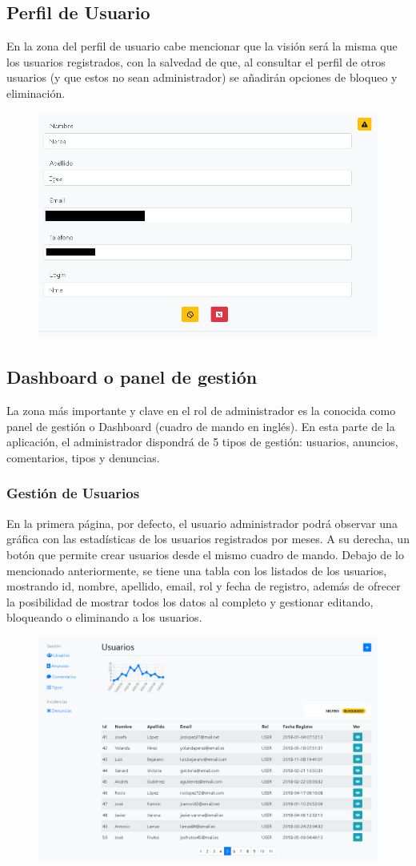 \subsection{Perfil de Usuario}
En la zona del perfil de usuario cabe mencionar que la visi\'{o}n ser\'{a} la misma que los usuarios registrados, con la salvedad de que, al consultar el perfil de otros usuarios (y que estos no sean administrador) se a\~{n}adir\'{a}n opciones de bloqueo y eliminaci\'{o}n.
\begin{figure}[h!]
\centering
\includegraphics[width=.4\textwidth]{Img/ManualUsuario/ADMIN_SEARCH_USER.png}
\end{figure}


\subsection{Dashboard o panel de gesti\'{o}n}
La zona m\'{a}s importante y clave en el rol de administrador es la conocida como panel de gesti\'{o}n o Dashboard (cuadro de mando en ingl\'{e}s).  En esta parte de la aplicaci\'{o}n, el administrador dispondr\'{a} de 5 tipos de gesti\'{o}n: usuarios, anuncios, comentarios, tipos y denuncias.

\subsubsection{Gesti\'{o}n de Usuarios}
En la primera p\'{a}gina, por defecto, el usuario administrador podr\'{a} observar una gr\'{a}fica con las estad\'{i}sticas de los usuarios registrados por meses. A su derecha, un bot\'{o}n que permite crear usuarios desde el mismo cuadro de mando. Debajo de lo mencionado anteriormente, se tiene una tabla con los listados de los usuarios, mostrando id, nombre, apellido, email, rol y fecha de registro, adem\'{a}s de ofrecer la posibilidad de mostrar todos los datos al completo y gestionar editando, bloqueando o eliminando a los usuarios.

\begin{figure}[h!]
\centering
\includegraphics[width=.8\textwidth]{Img/ManualUsuario/ADMIN_DASHBOARD_USER.png}
\end{figure}

